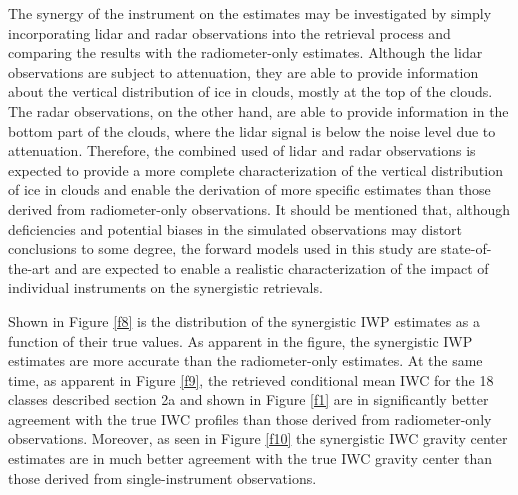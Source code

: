 \documentclass{ametsocV6.1}
\begin{document}
The synergy of the instrument on the estimates may be investigated by simply incorporating lidar 
and radar observations
into the retrieval process and comparing the results with the radiometer-only estimates.  Although
the lidar observations are subject to attenuation, they are able to provide information about the vertical
distribution of ice in clouds, mostly at the top of the clouds. The radar observations, on the other hand,
are able to provide information in the bottom part of the clouds, where the lidar signal is below the noise
level due to attenuation. Therefore, the combined used of lidar and radar observations is expected to 
provide a more complete characterization of the vertical distribution of ice in clouds and enable the
derivation of more specific estimates than those derived from radiometer-only observations. It should be mentioned that, 
although deficiencies 
and potential biases in the simulated observations may distort conclusions to some degree, the forward models
used in this study are state-of-the-art and are expected to enable a realistic characterization of the impact
of individual instruments on the synergistic retrievals.

Shown in Figure \ref{f8} is the distribution of the synergistic IWP estimates as a function of their true
values.  As apparent in the figure, the synergistic IWP estimates are more accurate than the radiometer-only
estimates. At the same time, as apparent in Figure \ref{f9}, the retrieved conditional mean IWC for the 
18 classes described section 2a and shown in Figure \ref{f1} are in significantly better
agreement with the true IWC profiles than those derived from radiometer-only observations.  Moreover,
as seen in Figure \ref{f10} the synergistic IWC gravity center estimates are in much better agreement with 
the true IWC gravity center than those derived from single-instrument observations.
\end{document}
